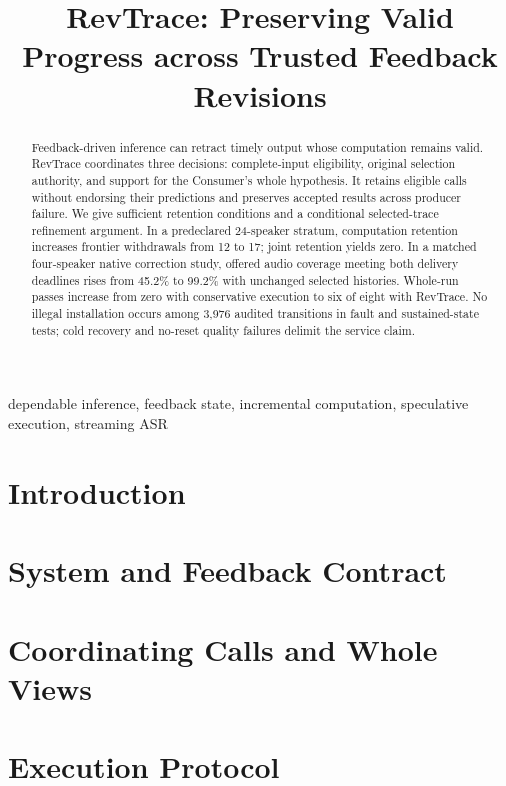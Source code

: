 \documentclass[conference,10pt]{IEEEtran}
\begin{document}
\title{RevTrace: Preserving Valid Progress across Trusted Feedback Revisions}
\author{}
\maketitle
\begin{abstract}
Feedback-driven inference can retract timely output whose computation
remains valid. RevTrace coordinates three decisions: complete-input
eligibility, original selection authority, and support for the Consumer's
whole hypothesis. It retains eligible calls without endorsing their
predictions and preserves accepted results across producer failure.
We give sufficient retention conditions and a conditional selected-trace
refinement argument. In a predeclared 24-speaker stratum, computation
retention increases frontier withdrawals from 12 to 17; joint retention
yields zero. In a matched four-speaker native correction study, offered
audio coverage meeting both delivery deadlines rises from 45.2\% to
99.2\% with unchanged selected histories. Whole-run passes increase from
zero with conservative execution to six of eight with RevTrace.
No illegal installation occurs among 3,976 audited
transitions in fault and sustained-state tests; cold recovery and
no-reset quality failures delimit the service claim.
\end{abstract}
\begin{IEEEkeywords}
dependable inference, feedback state, incremental computation, speculative execution, streaming ASR
\end{IEEEkeywords}
\section{Introduction}\label{sec:intro}

\section{System and Feedback Contract}\label{sec:contract}

\section{Coordinating Calls and Whole Views}\label{sec:continuation}





\section{Execution Protocol}\label{sec:protocol}


\end{document}
